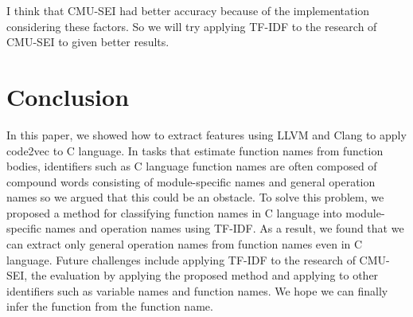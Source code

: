 \documentclass[JIP]{apris}
\begin{document}
I think that CMU-SEI had better accuracy because of the implementation considering these factors.
So we will try applying TF-IDF to the research of CMU-SEI to given better results.


\section{Conclusion}
In this paper, we showed how to extract features using LLVM and Clang to apply code2vec to C language.
In tasks that estimate function names from function bodies, identifiers such as C language function names are often composed of compound words consisting of module-specific names and general operation names so we argued that this could be an obstacle.
To solve this problem, we proposed a method for classifying function names in C language into module-specific names and operation names using TF-IDF.
As a result, we found that we can extract only general operation names from function names even in C language.
Future challenges include applying TF-IDF to the research of CMU-SEI, the evaluation by applying the proposed method and applying to other identifiers such as variable names and function names. We hope we can finally infer the function from the function name.
\end{document}
